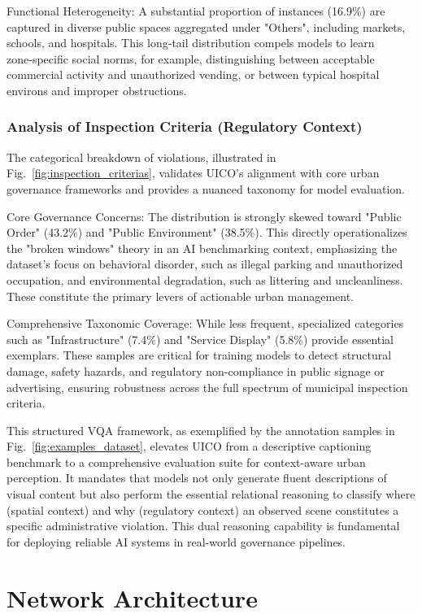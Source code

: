 \documentclass[lettersize,journal]{IEEEtran}
\begin{document}
	Functional Heterogeneity: A substantial proportion of instances (16.9\%) are captured in diverse public spaces aggregated under "Others", including markets, schools, and hospitals. This long‑tail distribution compels models to learn zone‑specific social norms, for example, distinguishing between acceptable commercial activity and unauthorized vending, or between typical hospital environs and improper obstructions.
	
	
	\subsubsection{Analysis of Inspection Criteria (Regulatory Context)}
	The categorical breakdown of violations, illustrated in Fig.~\ref{fig:inspection_criterias}, validates UICO's alignment with core urban governance frameworks and provides a nuanced taxonomy for model evaluation.
	
	Core Governance Concerns: The distribution is strongly skewed toward "Public Order" (43.2\%) and "Public Environment" (38.5\%). This directly operationalizes the "broken windows" theory in an AI benchmarking context, emphasizing the dataset's focus on behavioral disorder, such as illegal parking and unauthorized occupation, and environmental degradation, such as littering and uncleanliness. These constitute the primary levers of actionable urban management.
	
	Comprehensive Taxonomic Coverage: While less frequent, specialized categories such as "Infrastructure" (7.4\%) and "Service Display" (5.8\%) provide essential exemplars. These samples are critical for training models to detect structural damage, safety hazards, and regulatory non-compliance in public signage or advertising, ensuring robustness across the full spectrum of municipal inspection criteria.
	
	
	This structured VQA framework, as exemplified by the annotation samples in Fig.~\ref{fig:examples_dataset}, elevates UICO from a descriptive captioning benchmark to a comprehensive evaluation suite for context-aware urban perception. It mandates that models not only generate fluent descriptions of visual content but also perform the essential relational reasoning to classify where (spatial context) and why (regulatory context) an observed scene constitutes a specific administrative violation. This dual reasoning capability is fundamental for deploying reliable AI systems in real-world governance pipelines.
	
	\section{Network Architecture}
	
\end{document}
